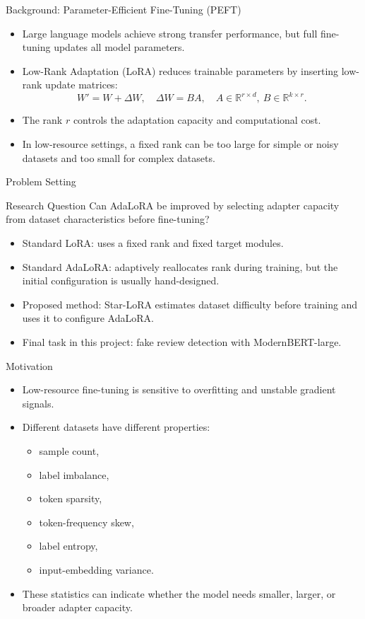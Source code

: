 \begin{frame}{Background: Parameter-Efficient Fine-Tuning (PEFT)}
\begin{itemize}
  \item Large language models achieve strong transfer performance, but full fine-tuning updates all model parameters.
  \item Low-Rank Adaptation (LoRA) reduces trainable parameters by inserting low-rank update matrices:
  \[
    W' = W + \Delta W,\quad \Delta W = BA,\quad
    A \in \mathbb{R}^{r \times d},\ B \in \mathbb{R}^{k \times r}.
  \]
  \item The rank \(r\) controls the adaptation capacity and computational cost.
  \item In low-resource settings, a fixed rank can be too large for simple or noisy datasets and too small for complex datasets.
\end{itemize}
\end{frame}

\begin{frame}{Problem Setting}
\begin{block}{Research Question}
Can AdaLoRA be improved by selecting adapter capacity from dataset characteristics before fine-tuning?
\end{block}

\vspace{8pt}
\begin{itemize}
  \item Standard LoRA: uses a fixed rank and fixed target modules.
  \item Standard AdaLoRA: adaptively reallocates rank during training, but the initial configuration is usually hand-designed.
  \item Proposed method: Star-LoRA estimates dataset difficulty before training and uses it to configure AdaLoRA.
  \item Final task in this project: fake review detection with ModernBERT-large.
\end{itemize}
\end{frame}

\begin{frame}{Motivation}
\begin{itemize}
  \item Low-resource fine-tuning is sensitive to overfitting and unstable gradient signals.
  \item Different datasets have different properties:
  \begin{itemize}
    \item sample count,
    \item label imbalance,
    \item token sparsity,
    \item token-frequency skew,
    \item label entropy,
    \item input-embedding variance.
  \end{itemize}
  \item These statistics can indicate whether the model needs smaller, larger, or broader adapter capacity.
\end{itemize}
\end{frame}
